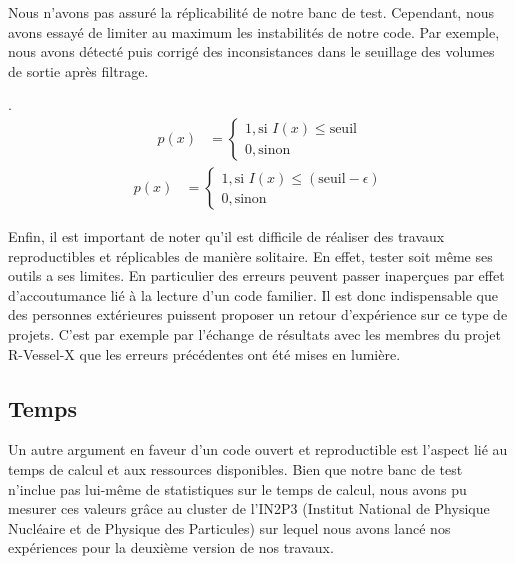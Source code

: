 Nous n'avons pas assuré la réplicabilité de notre banc de test. Cependant, nous avons essayé de limiter au maximum les instabilités de notre code. Par exemple, nous avons détecté puis corrigé des inconsistances dans le seuillage des volumes de sortie après filtrage. 

.
\begin{align}
    p(x) &=
    \begin{cases}
        1, \text{si~} I(x) \leq \text{seuil} \\
        0, \text{sinon}
    \end{cases}
    \label{eq:test_1}
\end{align}
 \begin{align}
    p(x) &=
    \begin{cases}
        1, \text{si~} I(x) \leq (\text{seuil} - \epsilon) \\
        0, \text{sinon}
    \end{cases}
    \label{eq:test_2}
\end{align}

Enfin, il est important de noter qu'il est difficile de réaliser des travaux reproductibles et réplicables de manière solitaire. En effet, tester soit même ses outils a ses limites. En particulier des erreurs peuvent passer inaperçues par effet d'accoutumance lié à la lecture d'un code familier. Il est donc indispensable que des personnes extérieures puissent proposer un retour d'expérience sur ce type de projets. C'est par exemple par l'échange de résultats avec les membres du projet R-Vessel-X que les erreurs précédentes ont été mises en lumière.
\subsection{Temps}
Un autre argument en faveur d'un code ouvert et reproductible est l'aspect lié au temps de calcul et aux ressources disponibles. Bien que notre banc de test n'inclue pas lui-même de statistiques sur le temps de calcul, nous avons pu mesurer ces valeurs grâce au cluster de l'IN2P3 (Institut National de Physique Nucléaire et de Physique des Particules) sur lequel nous avons lancé nos expériences pour la deuxième version de nos travaux. 

